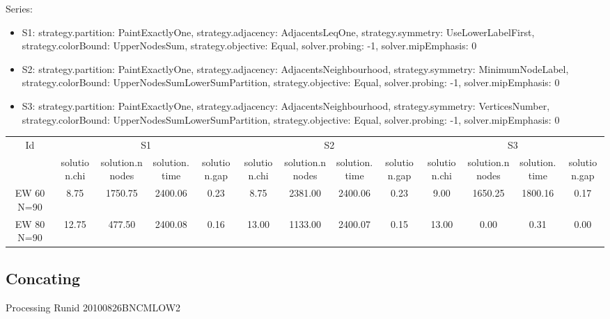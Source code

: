 \documentclass[landscape, 12pt]{report}
\begin{document}
Series:
\begin{itemize}
\item S1: strategy.partition: PaintExactlyOne, strategy.adjacency: AdjacentsLeqOne, strategy.symmetry: UseLowerLabelFirst, strategy.colorBound: UpperNodesSum, strategy.objective: Equal, solver.probing: -1, solver.mipEmphasis: 0
\item S2: strategy.partition: PaintExactlyOne, strategy.adjacency: AdjacentsNeighbourhood, strategy.symmetry: MinimumNodeLabel, strategy.colorBound: UpperNodesSumLowerSumPartition, strategy.objective: Equal, solver.probing: -1, solver.mipEmphasis: 0
\item S3: strategy.partition: PaintExactlyOne, strategy.adjacency: AdjacentsNeighbourhood, strategy.symmetry: VerticesNumber, strategy.colorBound: UpperNodesSumLowerSumPartition, strategy.objective: Equal, solver.probing: -1, solver.mipEmphasis: 0
\end{itemize}
\begin{tabular}{|c|cccc|cccc|cccc|}
\hline
\multicolumn{1}{|c|}{Id} & \multicolumn{4}{|c|}{S1} & \multicolumn{4}{|c|}{S2} & \multicolumn{4}{|c|}{S3}
\\
 & solution.chi & solution.nnodes & solution.time & solution.gap & solution.chi & solution.nnodes & solution.time & solution.gap & solution.chi & solution.nnodes & solution.time & solution.gap
\\
\hline
EW 60 N=90 & 8.75 & 1750.75 & 2400.06 & 0.23 & 8.75 & 2381.00 & 2400.06 & 0.23 & 9.00 & 1650.25 & 1800.16 & 0.17
\\
EW 80 N=90 & 12.75 & 477.50 & 2400.08 & 0.16 & 13.00 & 1133.00 & 2400.07 & 0.15 & 13.00 & 0.00 & 0.31 & 0.00
\\
\hline 
 \end{tabular}

	
	\subsection{Concating}
	
	Processing Runid 20100826BNCMLOW2
\end{document}
